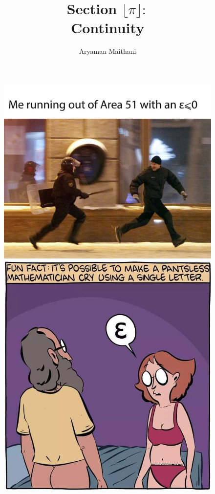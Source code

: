 \documentclass[handout, aspectratio=169]{beamer}
\begin{document}
\begin{frame} 
	\begin{figure}[t]
		\begin{minipage}{0.48\textwidth}
			\centering
			\includegraphics[width=5 cm]{7.jpg}
			
		\end{minipage}
		\begin{minipage}{0.48\textwidth}
			\centering
			\includegraphics[width=5 cm]{16.jpg}
			
		\end{minipage}
	\end{figure}
\end{frame}
\title{Section $\lfloor\pi\rfloor:$\\ Continuity}
\author{ }
\begin{frame} 
	\titlepage
\end{frame}
	\author{Aryaman Maithani}
\end{document}

